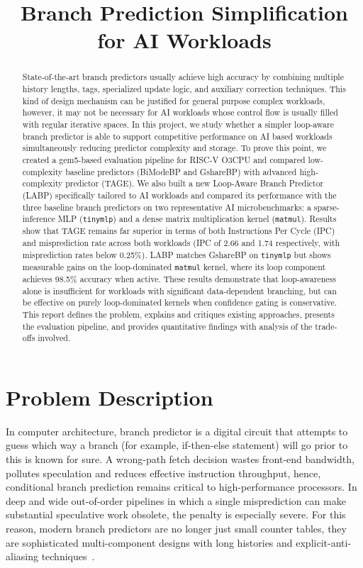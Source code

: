 \documentclass[conference]{IEEEtran}
\title{Branch Prediction Simplification for AI Workloads}
\author{
\IEEEauthorblockN{Simon Darota, Winner Abula}
\IEEEauthorblockA{
Department of Computer Science\\
Khalifa University\\
Abu Dhabi, UAE\\
\{100067950, 100066896\}@ku.ac.ae
}
}
\begin{document}
\maketitle

\begin{abstract}

State-of-the-art branch predictors usually achieve high accuracy by combining multiple history lengths, tags, specialized update logic, and auxiliary correction techniques. This kind of design mechanism can be justified for general purpose complex workloads, however, it may not be necessary for AI workloads whose control flow is usually filled with regular iterative spaces.
In this project, we study whether a simpler loop-aware branch predictor is able to support competitive performance on AI based workloads simultaneously reducing predictor complexity and storage. To prove this point, we created a gem5-based evaluation pipeline for RISC-V O3CPU and compared low-complexity baseline predictors (BiModeBP and GshareBP) with advanced high-complexity predictor (TAGE). We also built a new Loop-Aware Branch Predictor (LABP) specifically tailored to AI workloads and compared its performance with the three baseline branch predictors on two representative AI microbenchmarks: a sparse-inference MLP (\texttt{tinymlp}) and a dense matrix multiplication kernel (\texttt{matmul}). Results show that TAGE remains far superior in terms of both Instructions Per Cycle (IPC) and misprediction rate across both workloads (IPC of 2.66 and 1.74 respectively, with misprediction rates below 0.25\%). LABP matches GshareBP on \texttt{tinymlp} but shows measurable gains on the loop-dominated \texttt{matmul} kernel, where its loop component achieves 98.5\% accuracy when active. These results demonstrate that loop-awareness alone is insufficient for workloads with significant data-dependent branching, but can be effective on purely loop-dominated kernels when confidence gating is conservative. This report defines the problem, explains and critiques existing approaches, presents the evaluation pipeline, and provides quantitative findings with analysis of the trade-offs involved.
\end{abstract}

\section{Problem Description}
In computer architecture, branch predictor is a digital circuit that attempts to guess which way a branch (for example, if-then-else statement) will go prior to this is known for sure. A wrong-path fetch decision wastes front-end bandwidth, pollutes speculation and reduces effective instruction throughput, hence, conditional branch prediction remains critical to high-performance processors. In deep and wide out-of-order pipelines in which a single misprediction can make substantial speculative work obsolete, the penalty is especially severe. For this reason, modern branch predictors are no longer just small counter tables, they are sophisticated multi-component designs with long histories and explicit-anti-aliasing techniques~\cite{smith_1981,yeh_patt_1992,mcfarling_1993,seznec_michaud_2006}.
\end{document}
